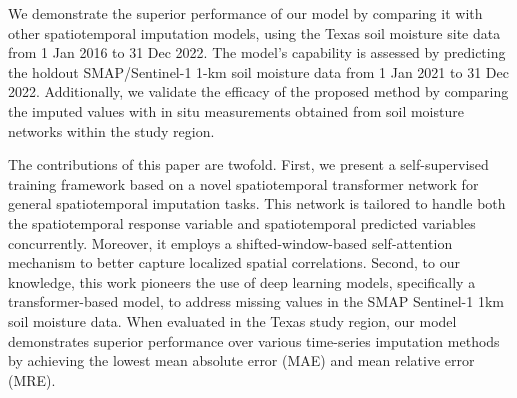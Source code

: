 \documentclass[11pt]{article}
\begin{document}
 We demonstrate the superior performance of our model by comparing it with other spatiotemporal imputation models, using the Texas soil moisture site data from 1 Jan 2016 to 31 Dec 2022. The model's capability is assessed by predicting the holdout SMAP/Sentinel-1 1-km soil moisture data from 1 Jan 2021 to 31 Dec 2022. Additionally, we validate the efficacy of the proposed method by comparing the imputed values with in situ measurements obtained from soil moisture networks within the study region.


The contributions of this paper are twofold. First, we present a self-supervised training framework based on a novel spatiotemporal transformer network for general spatiotemporal imputation tasks. This network is tailored to handle both the spatiotemporal response variable and spatiotemporal predicted variables concurrently. Moreover, it employs a shifted-window-based self-attention mechanism to better capture localized spatial correlations. Second, to our knowledge, this work pioneers the use of deep learning models, specifically a transformer-based model, to address missing values in the SMAP Sentinel-1 1km soil moisture data. When evaluated in the Texas study region, our model demonstrates superior performance over various time-series imputation methods by achieving the lowest mean absolute error (MAE) and mean relative error (MRE).
\end{document}
